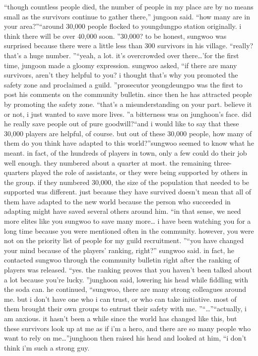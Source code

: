 “though countless people died, the number of people in my place are by no means small as the survivors continue to gather there,” jungoon said.
“how many are in your area?”“around 30,000 people flocked to youngdungpo station originally.
 i think there will be over 40,000 soon.
”30,000? to be honest, sungwoo was surprised because there were a little less than 300 survivors in his village.
“really? that’s a huge number.
”“yeah, a lot.
 it’s overcrowded over there…’for the first time, jungoon made a gloomy expression.
sungwoo asked, “if there are many survivors, aren’t they helpful to you? i thought that’s why you promoted the safety zone and proclaimed a guild.
”prosecutor yeongdeungpo was the first to post his comments on the community bulletin.
 since then he has attracted people by promoting the safety zone.
“that’s a misunderstanding on your part.
 believe it or not, i just wanted to save more lives.
”a bitterness was on junghoon’s face.
 did he really save people out of pure goodwill?“and i would like to say that these 30,000 players are helpful, of course.
 but out of these 30,000 people, how many of them do you think have adapted to this world?”sungwoo seemed to know what he meant.
 in fact, of the hundreds of players in town, only a few could do their job well enough.
 they numbered about a quarter at most.
the remaining three-quarters played the role of assistants, or they were being supported by others in the group.
if they numbered 30,000, the size of the population that needed to be supported was different.
just because they have survived doesn’t mean that all of them have adapted to the new world because the person who succeeded in adapting might have saved several others around him.
“in that sense, we need more elites like you sungwoo to save many more… i have been watching you for a long time because you were mentioned often in the community.
 however, you were not on the priority list of people for my guild recruitment.
”“you have changed your mind because of the players’ ranking, right?” sungwoo said.
in fact, he contacted sungwoo through the community bulletin right after the ranking of players was released.
“yes.
 the ranking proves that you haven’t been talked about a lot because you’re lucky.
”junghoon said, lowering his head while fiddling with the soda can.
 he continued, “sungwoo, there are many strong colleagues around me.
 but i don’t have one who i can trust, or who can take initiative.
 most of them brought their own groups to entrust their safety with me.
”“…”“actually, i am anxious.
 it hasn’t been a while since the world has changed like this, but these survivors look up at me as if i’m a hero, and there are so many people who want to rely on me…”junghoon then raised his head and looked at him, “i don’t think i’m such a strong guy.
